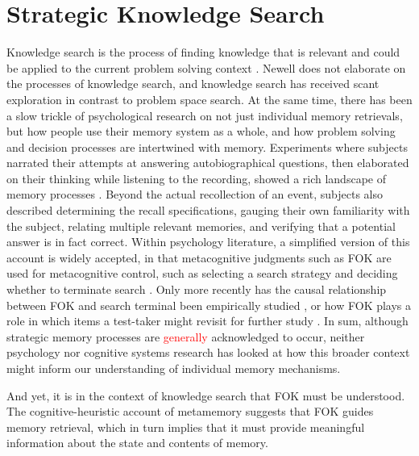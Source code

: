 \documentclass[10pt,letterpaper]{article}
\newcommand{\fixme}[2][]{#2}
\renewcommand{\fixme}[2][]{\textcolor{red}{#2}}
\begin{document}
\section{Strategic Knowledge Search}

Knowledge search is the process of finding knowledge that is relevant and could be applied to the current problem solving context \cite{Newell1972HumanProblemSolving}. %
Newell does not elaborate on the processes of knowledge search, and knowledge search has received scant exploration in contrast to problem space search.
At the same time, there has been a slow trickle of psychological research on not just individual memory retrievals, but how people use their memory system as a whole, and how problem solving and decision processes are intertwined with memory.
Experiments where subjects narrated their attempts at answering autobiographical questions, then elaborated on their thinking while listening to the recording, showed a rich landscape of memory processes \cite{Burgess1996ConfabulationAndThe}.
Beyond the actual recollection of an event, subjects also described determining the recall specifications, gauging their own familiarity with the subject, relating multiple relevant memories, and verifying that a potential answer is in fact correct.
Within psychology literature, a simplified version of this account is widely accepted, in that metacognitive judgments such as FOK are used for metacognitive control, such as selecting a search strategy and deciding whether to terminate search \cite{Nelson1990MetamemoryATheoretical}.
Only more recently has the causal relationship between FOK and search terminal been empirically studied \cite{Singer2008FeelingOfKnowing}, or how FOK plays a role in which items a test-taker might revisit for further study \cite{Hanczakowski2014FeelingOfKnowing}.
In sum, although strategic memory processes are \fixme[overusing generally, broadly, widely, etc. here]{generally} acknowledged to occur, neither psychology nor cognitive systems research has looked at how this broader context might inform our understanding of individual memory mechanisms.

And yet, it is in the context of knowledge search that FOK must be understood.
The cognitive-heuristic account of metamemory suggests that FOK guides memory retrieval, which in turn implies that it must provide meaningful information about the state and contents of memory. %
\end{document}
